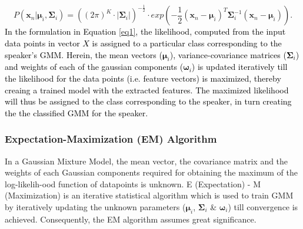 \documentclass{article}
\begin{document}
{{\begin{equation}
P(\bm x_n|\bm\mu_i,\bm\Sigma_i) = \left({{(2\pi)^K\cdot |\bm\Sigma_i|}}\right)^{-\frac{1}{2}}\cdot exp\left({-\frac{1}{2} (\bm x_n-\bm\mu_i)^T\bm\Sigma_i^{-1}(\bm x_n- \bm \mu_i)}\right).
\label{eq1}
\end{equation}
}
\textcolor{black}{In the formulation in Equation \ref{eq1}, the likelihood, computed from the input data points in vector $X$ is assigned to a particular class corresponding to the speaker's GMM. Herein, the mean vectors ($\bm \mu_i$), variance-covariance matrices ($\bm\Sigma_i$) and weights of each of the gaussian components ($\bm \omega_i$) is updated iteratively till the likelihood for the data points (i.e. feature vectors) is maximized, %
thereby creaing a trained model with the extracted features. The maximized likelihood will thus be assigned to the class corresponding to the speaker, in turn creating the the classified GMM for the speaker.} 

\subsubsection{{{Expectation-Maximization (EM)} Algorithm}} In a Gaussian Mixture Model, the mean vector, the covariance matrix and the weights of each Gaussian components required for obtaining the maximum of the log-likelih-ood function of datapoints is unknown. {E (Expectation) - M (Maximization) \cite{5}} is an iterative statistical algorithm which is used to train GMM by iteratively updating the unknown parameters ($\bm\mu_i$, $\bm\Sigma_i$ \& $\bm\omega_i$) till convergence is achieved.  Consequently, the EM algorithm assumes great significance. 

}
\end{document}
